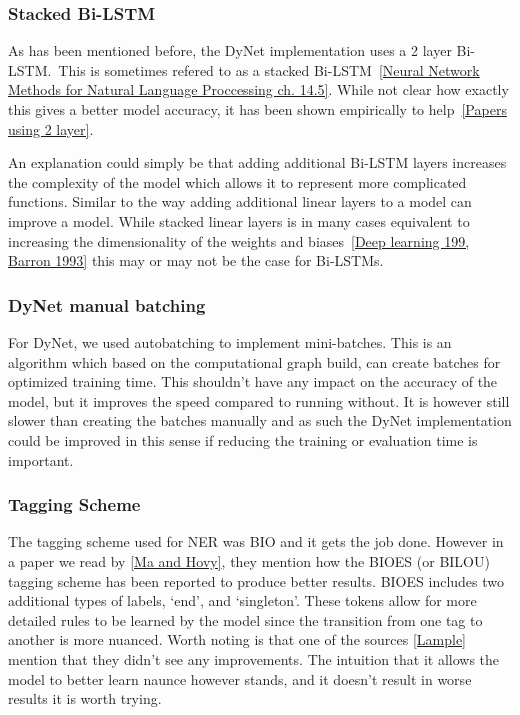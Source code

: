 \subsubsection{Stacked Bi-LSTM}

As has been mentioned before, the DyNet implementation uses a 2 layer Bi-LSTM.\
This is sometimes refered to as a stacked Bi-LSTM~\ref{Neural Network Methods
for Natural Language Proccessing ch. 14.5}. While not clear how exactly this
gives a better model accuracy, it has been shown empirically to help~\ref{Papers
using 2 layer}.

An explanation could simply be that adding additional Bi-LSTM layers increases
the complexity of the model which allows it to represent more complicated
functions. Similar to the way adding additional linear layers to a model can
improve a model. While stacked linear layers is in many cases equivalent to
increasing the dimensionality of the weights and biases~\ref{Deep learning 199,
Barron 1993} this may or may not be the case for Bi-LSTMs.

\subsubsection{DyNet manual batching}

For DyNet, we used autobatching to implement mini-batches. This is an algorithm
which based on the computational graph build, can create batches for optimized
training time. This shouldn't have any impact on the accuracy of the model, but
it improves the speed compared to running without. It is however still slower
than creating the batches manually and as such the DyNet implementation could be
improved in this sense if reducing the training or evaluation time is important.

\subsubsection{Tagging Scheme}

The tagging scheme used for NER was BIO and it gets the job done. However in a
paper we read by \ref{Ma and Hovy}, they mention how the BIOES (or BILOU)
tagging scheme has been reported to produce better results. BIOES includes two
additional types of labels, `end', and `singleton'. These tokens allow for more
detailed rules to be learned by the model since the transition from one tag to
another is more nuanced. Worth noting is that one of the sources \ref{Lample}
mention that they didn't see any improvements. The intuition that it allows the
model to better learn naunce however stands, and it doesn't result in worse
results it is worth trying.

